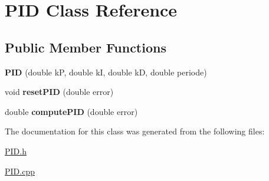 \hypertarget{class_p_i_d}{}\section{P\+ID Class Reference}
\label{class_p_i_d}
\subsection*{Public Member Functions}
\begin{DoxyCompactItemize}
\item 
{\bfseries P\+ID} (double kP, double kI, double kD, double periode)\hypertarget{class_p_i_d_ad10969b52a5c2c78775fee51de5a595c}{}\label{class_p_i_d_ad10969b52a5c2c78775fee51de5a595c}

\item 
void {\bfseries reset\+P\+ID} (double error)\hypertarget{class_p_i_d_a3fcf72ad59b79e2a5a67b6d110c37b3f}{}\label{class_p_i_d_a3fcf72ad59b79e2a5a67b6d110c37b3f}

\item 
double {\bfseries compute\+P\+ID} (double error)\hypertarget{class_p_i_d_a9777e338d838fbafc098dc15a28d6d1f}{}\label{class_p_i_d_a9777e338d838fbafc098dc15a28d6d1f}

\end{DoxyCompactItemize}


The documentation for this class was generated from the following files\+:\begin{DoxyCompactItemize}
\item 
\hyperlink{_p_i_d_8h}{P\+I\+D.\+h}\item 
\hyperlink{_p_i_d_8cpp}{P\+I\+D.\+cpp}\end{DoxyCompactItemize}
